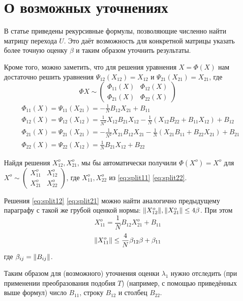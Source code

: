 \section{О возможных уточнениях}

В статье приведены рекурсивные формулы, позволяющие численно найти матрицу перехода \( U \).
Это даёт возможность для конкретной матрицы указать более точную оценку \( \beta \) и таким образом уточнить результаты.

Кроме того, можно заметить, что для решения уравнения \( X = \Phi(X) \)
нам достаточно решить уравнения \( \Psi_{12}(X_{12}) = X_{12} \) и \( \Psi_{21}(X_{21}) = X_{21} \),
где
\[
    \Phi X \sim
    \begin{pmatrix}
        \Phi_{11}(X) & \Phi_{12}(X) \\
        \Phi_{21}(X) & \Phi_{22}(X)
    \end{pmatrix}
\]
\begin{subequations}
    \begin{align}
        \label{eq:split11}
        & \Phi_{11}(X) = \Psi_{11}(X_{21}) = -\frac1N B_{12}X_{21} + B_{11} \\
        \label{eq:split12}
        & \Phi_{12}(X) = \Psi_{12}(X_{12}) = \frac{1}{N^2} X_{12}B_{21}X_{12} -
                                   \frac1N\left(X_{12}B_{22} +
                                   B_{11}X_{12}\right) + B_{12} \\
        \label{eq:split21}
        & \Phi_{21}(X) = \Psi_{21}(X_{21}) = -\frac{1}{N^2} X_{21}B_{12}X_{21} -
                                   \frac1N\left(X_{21}B_{11} +
                                   B_{22}X_{21}\right) +
                                   B_{21} \\
        \label{eq:split22}
        & \Phi_{22}(X) = \Psi_{22}(X_{12}) = \frac1N B_{21}X_{12} + B_{22}
    \end{align}
\end{subequations}

Найдя решения \( X_{12}^o, X_{21}^o \),
мы бы автоматически получили
\( \Phi(X^o) = X^o \) для
\( X^o \sim
\left(\begin{smallmatrix}
    X_{11}^o & X_{12}^o \\
    X_{21}^o & X_{22}^o
\end{smallmatrix}\right) \),
где \( X_{11}^o, X_{22}^o \) из \eqref{eq:split11} \eqref{eq:split22}.

Решения \eqref{eq:split12} \eqref{eq:split21} можно найти аналогично предыдущему параграфу
с такой же грубой оценкой нормы: \( {\left\|{X_{12}^o}\right\|}, {\left\|{X_{21}^o}\right\|} \leq 4\beta \).
При этом
\[ X_{11}^o = \frac1N B_{12} X_{21}^o + B_{11} \]
\[ {\left\|{X_{11}^o}\right\|} \leq \frac4N \beta_{12}\beta + \beta_{11} \]
где \( \beta_{ij} = {\left\|{B_{ij}}\right\|} \).

Таким образом для (возможного) уточнения оценки \( \lambda_1 \)
нужно отследить (при применении преобразования подобия \( T \)) (например, с помощью приведённых выше формул)
число \( B_{11} \), строку \( B_{12} \) и столбец \( B_{22} \).
